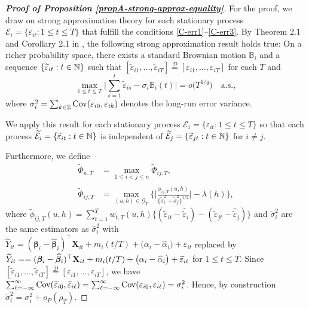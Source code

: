 \documentclass[a4paper,12pt]{article}
\begin{document}
\begin{proof}[\textnormal{\textbf{Proof of Proposition \ref{propA-strong-approx-equality}}}] 
For the proof, we draw on strong approximation theory for each stationary process $\mathcal{E}_i = \{\varepsilon_{it}: 1 \leq t \leq T\}$ that fulfill the conditions \ref{C-err1}--\ref{C-err3}. By Theorem 2.1 and Corollary 2.1 in \cite{BerkesLiuWu2014}, the following strong approximation result holds true: On a richer probability space, there exists a standard Brownian motion $\mathbb{B}_i$ and a sequence $\{ \widetilde{\varepsilon}_{it}: t \in \mathbb{N} \}$ such that $[\widetilde{\varepsilon}_{i1},\ldots,\widetilde{\varepsilon}_{iT}] \stackrel{\mathcal{D}}{=} [\varepsilon_{i1},\ldots,\varepsilon_{iT}]$ for each $T$ and 
\begin{equation}\label{eq-strongapprox-dep}
\max_{1 \le t \le T} \Big| \sum\limits_{s=1}^t \widetilde{\varepsilon}_{is} - \sigma_i \mathbb{B}_i(t) \Big| = o\big( T^{1/q} \big) \quad \text{a.s.},  
\end{equation}
where $\sigma^2_i = \sum_{k \in \mathbb{Z}} \textnormal{Cov}(\varepsilon_{i0}, \varepsilon_{ik})$ denotes the long-run error variance.

We apply this result for each stationary process $\mathcal{E}_i = \{\varepsilon_{it}: 1 \leq t \leq T\}$ so that each process $\widetilde{\mathcal{E}}_i = \{\widetilde{\varepsilon}_{it}: t\in \mathbb{N}\}$ is independent of $\widetilde{\mathcal{E}}_j= \{\widetilde{\varepsilon}_{jt}: t\in \mathbb{N}\}$ for $i \neq j$.

Furthermore, we define 
\begin{align*}
\widetilde{\Phi}_{n,T} &= \max_{1 \le i < j \le n} \widetilde{\Phi}_{ij,T},\\
\widetilde{\Phi}_{ij, T} &= \max_{(u,h) \in \mathcal{G}_T} \Big\{ \Big|\frac{\widetilde{\phi}_{ij, T}(u,h)}{\{\widetilde{\sigma}_i^2 + \widetilde{\sigma}_j^2 \}^{1/2}} \Big| - \lambda(h) \Big\},
\end{align*}
where $\widetilde{\phi}_{ij, T}(u,h) = \sum\nolimits_{t=1}^T w_{t,T}(u,h) \big\{ (\widetilde{\varepsilon}_{it} - \bar{\widetilde{\varepsilon}}_i)  - (\widetilde{\varepsilon}_{jt} - \bar{\widetilde{\varepsilon}}_j)\big\}$ and $\widetilde{\sigma}^2_i$ are the same estimators as $\widehat{\sigma}^2_i$ with $\widehat{Y}_{it} = (\bm{\beta}_i - \widehat{\bm{\beta}}_i)^\top \mathbf{X}_{it} + m_i ( t/T) + \big( \alpha_i - \widehat{\alpha}_i \big) + \varepsilon_{it}$
replaced by $\widetilde{Y}_{it} = \linebreak = (\bm{\beta}_i - \widehat{\bm{\beta}}_i)^\top \mathbf{X}_{it} + m_i(t/T) + \big( \alpha_i - \widehat{\alpha}_i \big) + \widetilde{\varepsilon}_{it}$  for $1 \le t \le T$. Since $[\widetilde{\varepsilon}_{i1},\ldots,\widetilde{\varepsilon}_{iT}] \stackrel{\mathcal{D}}{=} [\varepsilon_{i1},\ldots,\varepsilon_{iT}]$, we have $\sum\nolimits_{\ell=-\infty}^{\infty} \textnormal{Cov}(\widetilde{\varepsilon}_{i0}, \widetilde{\varepsilon}_{i\ell})  = \sum\nolimits_{\ell=-\infty}^{\infty} \textnormal{Cov}(\varepsilon_{i0}, \varepsilon_{i\ell})= \sigma_i^2$. Hence, by construction $\widetilde{\sigma}_i^2 = \sigma_i^2 + o_P(\rho_T)$.


\end{proof}
\end{document}

